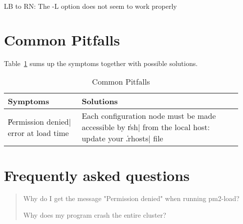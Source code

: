 
\begin{note}
  LB to RN: The -L option does not seem to work properly
\end{note}


\section{Common Pitfalls}
\label{sec:commonpitfalls}

Table~\ref{tbl:pitfalls} sums up the symptoms together with
possible solutions.
\begin{table}[p]
\caption{Common Pitfalls\label{tbl:pitfalls}}
\begin{center}
\begin{tabular}{|p{0.30\linewidth}|p{0.65\linewidth}|}                          \hline
Symptoms & 
Solutions                   
\\ 
\hline
\|Permission denied| error at load time & 
Each configuration node must be made
accessible by \|rsh| from the local host: update your
\|.rhosts| file                                  
\\ 
\hline
\end{tabular}
\end{center}
\end{table}

\section{Frequently asked questions}
\label{sec:faq}


\begin{quote}
  Why do I get the message "Permission denied" when running pm2-load?
  
  Why does my program crash the entire cluster?
\end{quote}

